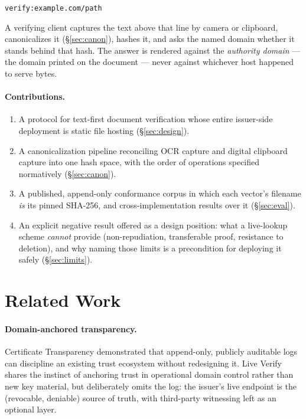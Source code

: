\documentclass[11pt]{article}
\begin{document}
\begin{center}
\texttt{verify:example.com/path}
\end{center}

A verifying client captures the text above that line by camera or clipboard,
canonicalizes it (\S\ref{sec:canon}), hashes it, and asks the named domain
whether it stands behind that hash. The answer is rendered against the
\emph{authority domain} --- the domain printed on the document --- never
against whichever host happened to serve bytes.

\paragraph{Contributions.}
\begin{enumerate}
  \item A protocol for text-first document verification whose entire
        issuer-side deployment is static file hosting
        (\S\ref{sec:design}).
  \item A canonicalization pipeline reconciling OCR capture and digital
        clipboard capture into one hash space, with the order of operations
        specified normatively (\S\ref{sec:canon}).
  \item A published, append-only conformance corpus in which each vector's
        filename \emph{is} its pinned SHA-256, and cross-implementation
        results over it (\S\ref{sec:eval}).
  \item An explicit negative result offered as a design position: what a
        live-lookup scheme \emph{cannot} provide (non-repudiation,
        transferable proof, resistance to deletion), and why naming those
        limits is a precondition for deploying it safely
        (\S\ref{sec:limits}).
\end{enumerate}

\section{Related Work}\label{sec:related}

\paragraph{Domain-anchored transparency.} Certificate Transparency
\cite{rfc6962} demonstrated that append-only, publicly auditable logs can
discipline an existing trust ecosystem without redesigning it. Live Verify
shares the instinct of anchoring trust in operational domain control rather
than new key material, but deliberately omits the log: the issuer's live
endpoint is the (revocable, deniable) source of truth, with third-party
witnessing left as an optional layer.
\end{document}

